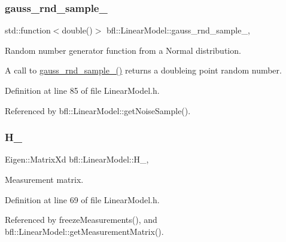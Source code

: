 \subsubsection{\texorpdfstring{gauss\+\_\+rnd\+\_\+sample\+\_\+}{gauss\_rnd\_sample\_}}
{\footnotesize\ttfamily std\+::function$<$double()$>$ bfl\+::\+Linear\+Model\+::gauss\+\_\+rnd\+\_\+sample\+\_\+\hspace{0.3cm}{\ttfamily [protected]}, {\ttfamily [inherited]}}



Random number generator function from a Normal distribution. 

A call to {\ttfamily \mbox{\hyperlink{classbfl_1_1LinearModel_aa58a166ce01d56574fe0b3f4d41dea19}{gauss\+\_\+rnd\+\_\+sample\+\_\+()}}} returns a doubleing point random number. 

Definition at line 85 of file Linear\+Model.\+h.



Referenced by bfl\+::\+Linear\+Model\+::get\+Noise\+Sample().

\mbox{\label{classbfl_1_1LinearModel_a16918b937b83c701d78f713f529d1079}} 
\subsubsection{\texorpdfstring{H\+\_\+}{H\_}}
{\footnotesize\ttfamily Eigen\+::\+Matrix\+Xd bfl\+::\+Linear\+Model\+::\+H\+\_\+\hspace{0.3cm}{\ttfamily [protected]}, {\ttfamily [inherited]}}



Measurement matrix. 



Definition at line 69 of file Linear\+Model.\+h.



Referenced by freeze\+Measurements(), and bfl\+::\+Linear\+Model\+::get\+Measurement\+Matrix().

\mbox{\label{classbfl_1_1SimulatedLinearSensor_a1dab66fabc28a8bf798bff05230ab6be}} 
